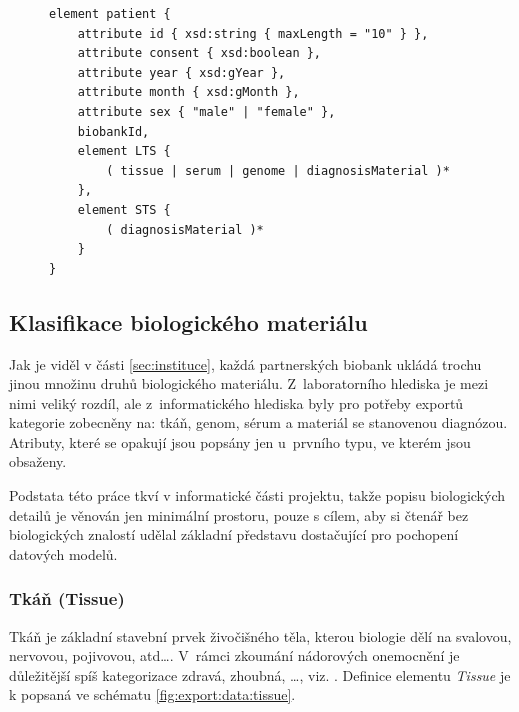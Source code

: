 \begin{figure}[h!]
\begin{center}
\begin{lstlisting}[language=XML, caption={Element pacienta v~exportním schéma.}, label={fig:export:data:patient}]
element patient {		
	attribute id { xsd:string { maxLength = "10" } },		
	attribute consent { xsd:boolean },   
	attribute year { xsd:gYear },	  
	attribute month { xsd:gMonth },   
	attribute sex { "male" | "female" },	  
	biobankId,		
	element LTS {
		( tissue | serum | genome | diagnosisMaterial )*
	},		
	element STS {
		( diagnosisMaterial )*
	}
}
\end{lstlisting}
\end{center}
\end{figure}

\subsection{Klasifikace biologického materiálu}\label{chapter:analysis:subsection:index}
Jak je viděl v části \ref{sec:instituce}, každá partnerských biobank ukládá trochu jinou množinu druhů biologického materiálu. Z~laboratorního hlediska je mezi nimi veliký rozdíl, ale z~informatického hlediska byly pro potřeby exportů kategorie zobecněny na: tkáň, genom, sérum a materiál se stanovenou diagnózou. Atributy, které se opakují jsou popsány jen u~prvního typu, ve kterém jsou obsaženy.

Podstata této práce tkví v informatické části projektu, takže popisu biologických detailů je věnován jen minimální prostoru, pouze s cílem, aby si čtenář bez biologických znalostí udělal základní představu dostačující pro pochopení datových modelů.


\subsubsection{Tkáň (Tissue)}
Tkáň je základní stavební prvek živočišného těla, kterou biologie dělí na svalovou, nervovou, pojivovou, atd\ldots . V~rámci zkoumání nádorových onemocnění je důležitější spíš kategorizace zdravá, zhoubná, \ldots, viz. .
Definice elementu \textit{Tissue} je k popsaná ve schématu \ref{fig:export:data:tissue}.

